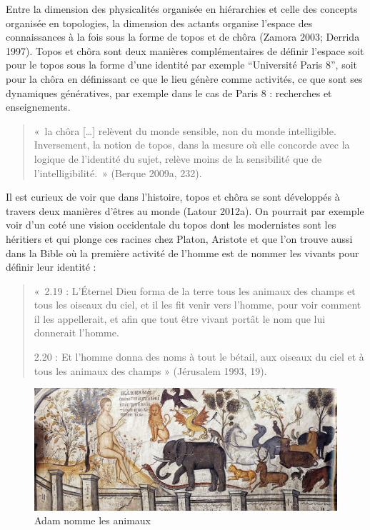 \documentclass[
  letterpaper,
  DIV=11,
  numbers=noendperiod]{scrreprt}
\begin{document}
Entre la dimension des physicalités organisée en hiérarchies et celle
des concepts organisée en topologies, la dimension des actants organise
l'espace des connaissances à la fois sous la forme de topos et de chôra
(Zamora 2003; Derrida 1997). Topos et chôra sont deux manières
complémentaires de définir l'espace soit pour le topos sous la forme
d'une identité par exemple ``Université Paris 8'', soit pour la chôra en
définissant ce que le lieu génère comme activités, ce que sont ses
dynamiques génératives, par exemple dans le cas de Paris 8 : recherches
et enseignements.

\begin{quote}
«~la chôra {[}\ldots{]} relèvent du monde sensible, non du monde
intelligible. Inversement, la notion de topos, dans la mesure où elle
concorde avec la logique de l'identité du sujet, relève moins de la
sensibilité que de l'intelligibilité.~» (Berque 2009a, 232).
\end{quote}

Il est curieux de voir que dans l'histoire, topos et chôra se sont
développés à travers deux manières d'êtres au monde (Latour 2012a). On
pourrait par exemple voir d'un coté une vision occidentale du topos dont
les modernistes sont les héritiers et qui plonge ces racines chez
Platon, Aristote et que l'on trouve aussi dans la Bible où la première
activité de l'homme est de nommer les vivants pour définir leur identité
:

\begin{quote}
«~2.19 : L'Éternel Dieu forma de la terre tous les animaux des champs et
tous les oiseaux du ciel, et il les fit venir vers l'homme, pour voir
comment il les appellerait, et afin que tout être vivant portât le nom
que lui donnerait l'homme.

2.20 : Et l'homme donna des noms à tout le bétail, aux oiseaux du ciel
et à tous les animaux des champs » (Jérusalem 1993, 19).
\end{quote}

\begin{figure}

{\centering \includegraphics{images/Adam_naming_animals_-_Moni_Ayou_Nikolaou_(Meteora).jpg}

}

\caption{\label{fig-adamNomme}Adam nomme les animaux}

\end{figure}
\end{document}
